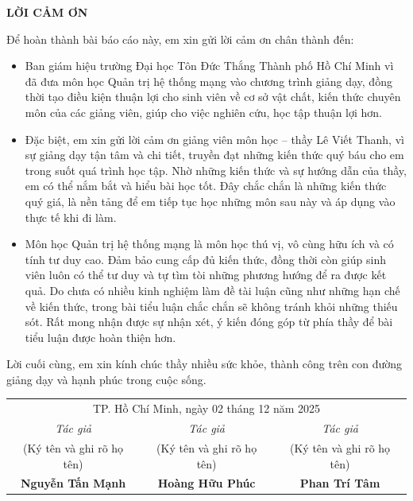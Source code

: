 \begin{center}
\Large \textbf{LỜI CẢM ƠN}
\end{center}


    Để hoàn thành bài báo cáo này, em xin gửi lời cảm ơn chân thành đến:

    \begin{itemize}
        \item Ban giám hiệu trường Đại học Tôn Đức Thắng Thành phố Hồ Chí Minh vì đã đưa môn học Quản trị hệ thống mạng vào chương trình giảng dạy, đồng thời tạo điều kiện thuận lợi cho sinh viên về cơ sở vật chất, kiến thức chuyên môn của các giảng viên, giúp cho việc nghiên cứu, học tập thuận lợi hơn.
        \item Đặc biệt, em xin gửi lời cảm ơn giảng viên môn học – thầy Lê Viết Thanh, vì sự giảng dạy tận tâm và chi tiết, truyền đạt những kiến thức quý báu cho em trong suốt quá trình học tập. Nhờ những kiến thức và sự hướng dẫn của thầy, em có thể nắm bắt và hiểu bài học tốt. Đây chắc chắn là những kiến thức quý giá, là nền tảng để em tiếp tục học những môn sau này và áp dụng vào thực tế khi đi làm.
    \end{itemize}

    \begin{itemize}
        \item Môn học Quản trị hệ thống mạng là môn học thú vị, vô cùng hữu ích và có tính tư duy cao. Đảm bảo cung cấp đủ kiến thức, đồng thời còn giúp sinh viên luôn có thể tư duy và tự tìm tòi những phương hướng để ra được kết quả. Do chưa có nhiều kinh nghiệm làm đề tài luận cũng như những hạn chế về kiến thức, trong bài tiểu luận chắc chắn sẽ không tránh khỏi những thiếu sót. Rất mong nhận được sự nhận xét, ý kiến đóng góp từ phía thầy để bài tiểu luận được hoàn thiện hơn.
    \end{itemize}

    Lời cuối cùng, em xin kính chúc thầy nhiều sức khỏe, thành công trên con đường giảng dạy và hạnh phúc trong cuộc sống.

    \vspace{2cm} %

\begin{center} %
    \begin{tabular}{c c c} %
        \multicolumn{3}{c}{TP. Hồ Chí Minh, ngày 02 tháng 12 năm 2025} \\[0.5cm] %
        
        \textit{Tác giả} & \textit{Tác giả} & \textit{Tác giả} \\
        (Ký tên và ghi rõ họ tên) & (Ký tên và ghi rõ họ tên) & (Ký tên và ghi rõ họ tên) \\[2.5cm] %
        
        \textbf{Nguyễn Tấn Mạnh}& \textbf{Hoàng Hữu Phúc} & \textbf{Phan Trí Tâm}
    \end{tabular}
\end{center}